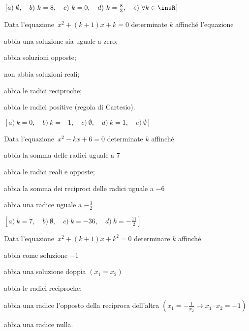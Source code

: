 \begin{flushright}
$\left[a)~\emptyset ,\quad b)~k = 8 ,\quad c)~ k = 0,\quad 
d)~k = \frac{8}{3} ,\quad e)~\forall k \in \insR\right]$
\end{flushright}

\begin{esercizio}[\Ast]
 \label{ese:3.99}
Data l'equazione~$x^{2} + (k + 1) x + k = 0$ determinate $k$ affinché 
l'equazione
\begin{enumeratea}
\item abbia una soluzione sia uguale a zero;~
\item abbia soluzioni opposte;~
\item non abbia soluzioni reali;~
\item abbia le radici reciproche;~
\item abbia le radici positive (regola di Cartesio).
\end{enumeratea}
\end{esercizio}

\begin{flushright}
$\left[a)~ k = 0 ,\quad b)~ k =-1 ,\quad c)~ \emptyset ,\quad 
d)~ k = 1 ,\quad e)~ \emptyset \right]$
\end{flushright}

\begin{esercizio}[\Ast]
 \label{ese:3.100}
Data l'equazione~$x^{2}-kx + 6 = 0$ determinate $k$ affinché
\begin{enumeratea}
\item abbia la somma delle radici uguale a $7$
\item abbia le radici reali e opposte;~
\item abbia la somma dei reciproci delle radici uguale a $-6$
\item abbia una radice uguale a $- \frac{3}{2}$
\end{enumeratea}
\end{esercizio}

\begin{flushright}
$\left[a)~ k = 7 ,\quad b)~ \emptyset ,\quad c)~ k =-36 ,\quad 
d)~ k =-\frac{11}{2} \right]$
\end{flushright}

\newpage %

\begin{esercizio}[\Ast]
 \label{ese:3.101}
Data l'equazione~$x^{2} + (k + 1) x + k^{2} = 0$ determinare $k$ affinché
\begin{enumeratea}
\item abbia come soluzione $-1$
\item abbia una soluzione doppia $(x_1 =x_2)$
\item abbia le radici reciproche;~
\item abbia una radice l'opposto della reciproca dell'altra 
$\left(x_1=-\frac{1}{x_2}\rightarrow x_1 \cdot x_2=-1\right)$
\item abbia una radice nulla.
\end{enumeratea}
\end{esercizio}


